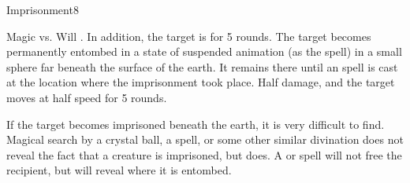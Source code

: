 \begin{spellsection}{Imprisonment}{8}
    \begin{spellheader}
    \end{spellheader}
    \begin{spellcontent}
        \begin{spelltargetinginfo}
        \end{spelltargetinginfo}
        \begin{spelleffects}
            \begin{spellattack}{Magic vs. Will}
                \spellsuccess {}. In addition, the target is \slowed for 5 rounds.
                \spellcritical The target becomes permanently entombed in a state of suspended animation (as the  spell) in a small sphere far beneath the surface of the earth. It remains there until an  spell is cast at the location where the imprisonment took place.
                \spellfailure Half damage, and the target moves at half speed for 5 rounds.
            \end{spellattack}
        \end{spelleffects}
    \end{spellcontent}
    \begin{spellfooter}
        \spellnotes If the target becomes imprisoned beneath the earth, it is very difficult to find. Magical search by a crystal ball, a  spell, or some other similar divination does not reveal the fact that a creature is imprisoned, but  does. A  or  spell will not free the recipient, but will reveal where it is entombed.
        \miscastrandom
    \end{spellfooter}
\end{spellsection}

